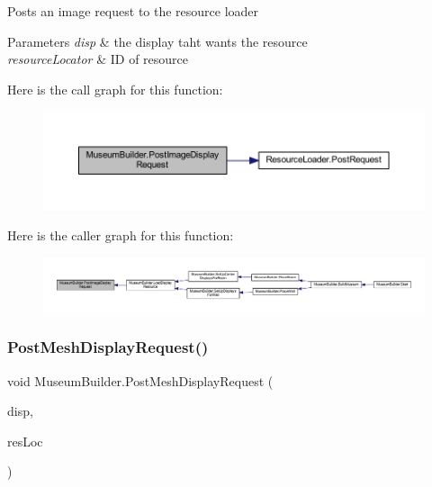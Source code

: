 Posts an image request to the resource loader 


\begin{DoxyParams}{Parameters}
{\em disp} & the display taht wants the resource\\
\hline
{\em resource\+Locator} & ID of resource\\
\hline
\end{DoxyParams}
Here is the call graph for this function\+:
\nopagebreak
\begin{figure}[H]
\begin{center}
\leavevmode
\includegraphics[width=350pt]{class_museum_builder_a4d5a59830643d185fbda5b11a251ffc3_cgraph}
\end{center}
\end{figure}
Here is the caller graph for this function\+:
\nopagebreak
\begin{figure}[H]
\begin{center}
\leavevmode
\includegraphics[width=350pt]{class_museum_builder_a4d5a59830643d185fbda5b11a251ffc3_icgraph}
\end{center}
\end{figure}
\mbox{\label{class_museum_builder_a4e5fce7036671ef7bf735b341e56bbf2}} 
\subsubsection{\texorpdfstring{Post\+Mesh\+Display\+Request()}{PostMeshDisplayRequest()}}
{\footnotesize\ttfamily void Museum\+Builder.\+Post\+Mesh\+Display\+Request (\begin{DoxyParamCaption}\item[{\mbox{\hyperlink{class_mesh_display}{Mesh\+Display}}}]{disp,  }\item[{int}]{res\+Loc }\end{DoxyParamCaption})\hspace{0.3cm}{\ttfamily [private]}}



